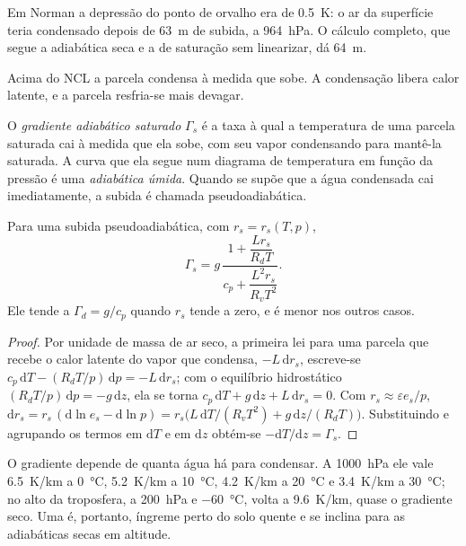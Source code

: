 Em Norman a depressão do ponto de orvalho era de \qty{0.5}{K}: o ar da superfície teria condensado depois de
\qty{63}{m} de subida, a \qty{964}{hPa}. O cálculo completo, que segue a adiabática seca e
a  de saturação sem linearizar, dá \qty{64}{m}.

Acima do NCL a parcela condensa à medida que sobe. A condensação libera calor latente, e a parcela
resfria-se mais devagar.

\begin{definition}\label{def:b2:atmospheric-thermodynamics:moist-adiabat}
O \emph{gradiente adiabático saturado} $\Gamma_s$ é
a taxa à qual a temperatura de uma parcela saturada cai à medida que ela sobe, com seu vapor condensando
para mantê-la saturada. A curva que ela segue num diagrama de temperatura em função da pressão é uma
\emph{adiabática úmida}. Quando se supõe que a água condensada cai
imediatamente, a subida é chamada pseudoadiabática.
\end{definition}

\begin{proposition}\label{prop:b2:atmospheric-thermodynamics:gamma-s}
Para uma subida pseudoadiabática, com $r_s = r_s(T, p)$,
\[
  \Gamma_s = g\,\frac{1 + \dfrac{L r_s}{R_d T}}{c_p + \dfrac{L^2 r_s}{R_v T^2}} .
\]
Ele tende a $\Gamma_d = g/c_p$ quando $r_s$ tende a zero, e é menor nos outros casos.
\end{proposition}

\begin{proof}
Por unidade de massa de ar seco, a primeira lei para uma parcela que recebe o calor latente do vapor
que condensa, $-L\,\mathrm{d}r_s$, escreve-se $c_p\,\mathrm{d}T - (R_dT/p)\,\mathrm{d}p = -L\,
\mathrm{d}r_s$; com o equilíbrio hidrostático $(R_dT/p)\,\mathrm{d}p = -g\,\mathrm{d}z$, ela se torna
$c_p\,\mathrm{d}T + g\,\mathrm{d}z + L\,\mathrm{d}r_s = 0$. Com $r_s \approx \varepsilon e_s/p$,
$\mathrm{d}r_s = r_s\,(\mathrm{d}\ln e_s - \mathrm{d}\ln p) = r_s\bigl(L\,\mathrm{d}T/(R_vT^2) +
g\,\mathrm{d}z/(R_dT)\bigr)$. Substituindo e agrupando os termos em $\mathrm{d}T$ e em
$\mathrm{d}z$ obtém-se $-\mathrm{d}T/\mathrm{d}z = \Gamma_s$.
\end{proof}

O gradiente depende de quanta água há para condensar. A \qty{1000}{hPa} ele vale
\qty{6.5}{K/km} a \qty{0}{\celsius}, \qty{5.2}{K/km} a \qty{10}{\celsius}, \qty{4.2}{K/km} a
\qty{20}{\celsius} e \qty{3.4}{K/km} a \qty{30}{\celsius}; no alto da troposfera, a
\qty{200}{hPa} e \qty{-60}{\celsius}, volta a \qty{9.6}{K/km}, quase o gradiente seco. Uma
 é, portanto, íngreme perto do solo quente e se inclina para as adiabáticas secas em altitude.

